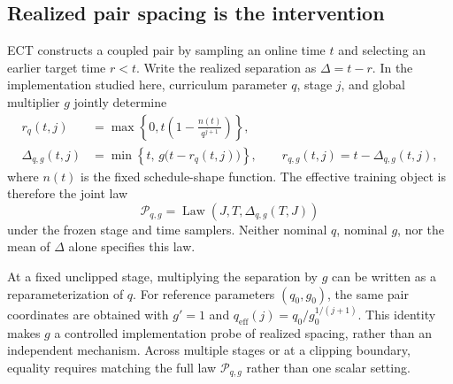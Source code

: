 \subsection{Realized pair spacing is the intervention}
\label{sec:realized-spacing}

ECT constructs a coupled pair by sampling an online time $t$ and selecting an
earlier target time $r<t$.  Write the realized separation as
$\Delta=t-r$.  In the implementation studied here, curriculum parameter $q$,
stage $j$, and global multiplier $g$ jointly determine
\begin{align}
  r_q(t,j)
  &=\max\!\left\{0,
      t\left(1-\frac{n(t)}{q^{j+1}}\right)\right\},
  \\
  \Delta_{q,g}(t,j)
  &=\min\!\left\{t,\,g\bigl(t-r_q(t,j)\bigr)\right\},
  \qquad
  r_{q,g}(t,j)=t-\Delta_{q,g}(t,j),
  \label{eq:realized-spacing-construction}
\end{align}
where $n(t)$ is the fixed schedule-shape function.  The effective training
object is therefore the joint law
\begin{equation}
  \mathcal{P}_{q,g}
  =\operatorname{Law}\!\left(J,T,\Delta_{q,g}(T,J)\right)
  \label{eq:effective-spacing-law}
\end{equation}
under the frozen stage and time samplers.  Neither nominal $q$, nominal $g$,
nor the mean of $\Delta$ alone specifies this law.

At a fixed unclipped stage, multiplying the separation by $g$ can be written
as a reparameterization of $q$.  For reference parameters $(q_0,g_0)$, the
same pair coordinates are obtained with $g'=1$ and
$q_{\mathrm{eff}}(j)=q_0/g_0^{1/(j+1)}$.  This identity makes $g$ a controlled
implementation probe of realized spacing, rather than an independent
mechanism.  Across multiple stages or at a clipping boundary, equality
requires matching the full law $\mathcal{P}_{q,g}$ rather than one scalar
setting.

